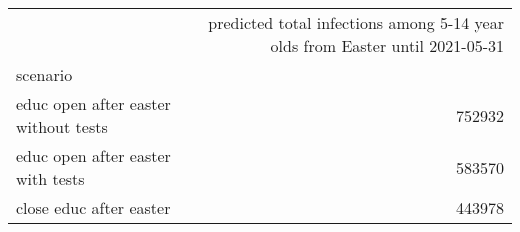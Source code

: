 \begin{tabular}{lr}
\toprule
{} &  predicted total infections among 5-14 year olds from Easter until 2021-05-31 \\
scenario                               &                                                                               \\
\midrule
 educ open after easter  without tests &                                             752932 \\
 educ open after easter  with tests    &                                             583570 \\
 close educ after easter               &                                             443978 \\
\bottomrule
\end{tabular}
